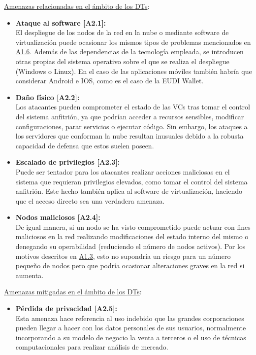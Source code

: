 \documentclass[../main.tex]{subfiles}
\begin{document}
\begin{enumerate}[label=\textbf{R2.\arabic*}, leftmargin=48pt]
    \underline{Amenazas relacionadas en el ámbito de los \acrshort{DT}s}:
    \begin{itemize}
        \item \textbf{Ataque al software [A2.1]:}\label{A2.1}
        \\ El despliegue de los nodos de la red en la nube o mediante software de virtualización puede ocasionar los mismos tipos de problemas mencionados en \hyperref[A1.6]{A1.6}. Además de las dependencias de la tecnología empleada, se introducen otras propias del sistema operativo sobre el que se realiza el despliegue (Windows o Linux). En el caso de las aplicaciones móviles también habría que considerar Android e IOS, como es el caso de la \acrshort{EUDI Wallet}.
        \item \textbf{Daño físico [A2.2]:}\label{A2.2}
        \\ Los atacantes pueden comprometer el estado de las \acrshort{VC}s tras tomar el control del sistema anfitrión, ya que podrían acceder a recursos sensibles, modificar configuraciones, parar servicios o ejecutar código. Sin embargo, los ataques a los servidores que conforman la nube resultan inusuales debido a la robusta capacidad de defensa que estos suelen poseen.
        \item \textbf{Escalado de privilegios [A2.3]:}\label{A2.3}
        \\ Puede ser tentador para los atacantes realizar acciones maliciosas en el sistema que requieran privilegios elevados, como tomar el control del sistema anfitrión. Este hecho también aplica al software de virtualización, haciendo que el acceso directo sea una verdadera amenaza.
        \item \textbf{Nodos maliciosos [A2.4]:}\label{A2.4}
        \\ De igual manera, si un nodo se ha visto comprometido puede actuar con fines maliciosos en la red realizando modificaciones del estado interno del mismo o denegando su operabilidad  (reduciendo el número de nodos activos). Por los motivos descritos en \hyperref[A1.3]{A1.3}, esto no supondría un riesgo para un número pequeño de nodos pero que podría ocasionar alteraciones graves en la red si aumenta.
    \end{itemize}
    
    \underline{Amenazas mitigadas en el ámbito de los \acrshort{DT}s}: 
    \begin{itemize}
        \item \textbf{Pérdida de privacidad [A2.5]:}\label{A2.5}
        \\ Esta amenaza hace referencia al uso indebido que las grandes corporaciones pueden llegar a hacer con los datos personales de sus usuarios, normalmente incorporando a su modelo de negocio la venta a terceros o el uso de técnicas computacionales para realizar análisis de mercado. 
        

\end{itemize}
\end{enumerate}
\end{document}
